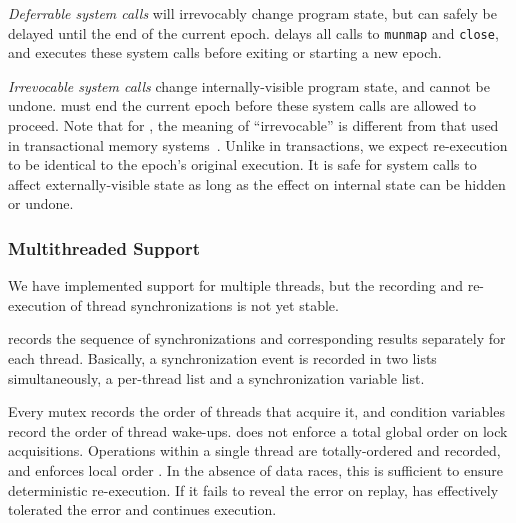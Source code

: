 \emph{Deferrable system calls} will irrevocably change program state, but can safely be delayed until the end of the current epoch. \doubletake{} delays all calls to \texttt{munmap} and \texttt{close}, and executes these system calls before exiting or starting a new epoch.
	
\emph{Irrevocable system calls} change internally-visible program state, and cannot be undone. \doubletake{} must end the current epoch before these system calls are allowed to proceed. Note that for \doubletake{}, the meaning of ``irrevocable'' is different from that used in transactional memory systems~\cite{Irrevocabletrans}. Unlike in transactions, we expect re-execution to be identical to the epoch's original execution. It is safe for system calls to affect externally-visible state as long as the effect on internal state can be hidden or undone.



\subsubsection*{Multithreaded Support}
We have implemented support for multiple threads, but the recording and re-execution of thread synchronizations is not yet stable. 

\doubletake{} records the sequence of synchronizations and corresponding results separately for each thread. Basically, a synchronization event is recorded in two lists simultaneously, a per-thread list and a synchronization variable list. 

Every mutex records the order of threads that acquire it, and condition variables record the order of thread wake-ups. \doubletake{} does not enforce a total global order on lock acquisitions. Operations within a single thread are totally-ordered and recorded, and \doubletake{} enforces local order . In the absence of data races, this is sufficient to ensure deterministic re-execution. If it fails to reveal the error on replay, \doubletake{} has effectively tolerated the error and continues execution.


